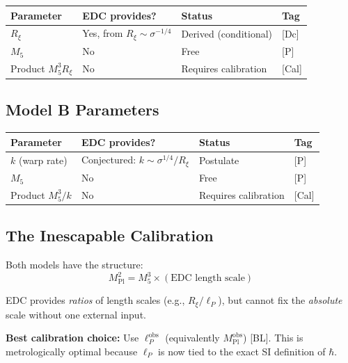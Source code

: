 \documentclass[11pt,a4paper]{article}
\newcommand{\Mpl}{M_{\text{Pl}}}
\newcommand{\Mfive}{M_5}
\newcommand{\Rxi}{R_\xi}
\begin{document}
\begin{center}
\begin{tabular}{@{}llll@{}}
\toprule
\textbf{Parameter} & \textbf{EDC provides?} & \textbf{Status} & \textbf{Tag} \\
\midrule
$\Rxi$ & Yes, from $\Rxi \sim \sigma^{-1/4}$ & Derived (conditional) & [Dc] \\
$\Mfive$ & No & Free & [P] \\
Product $\Mfive^3 \Rxi$ & No & Requires calibration & [Cal] \\
\bottomrule
\end{tabular}
\end{center}

\subsection{Model B Parameters}

\begin{center}
\begin{tabular}{@{}llll@{}}
\toprule
\textbf{Parameter} & \textbf{EDC provides?} & \textbf{Status} & \textbf{Tag} \\
\midrule
$k$ (warp rate) & Conjectured: $k \sim \sigma^{1/4}/\Rxi$ & Postulate & [P] \\
$\Mfive$ & No & Free & [P] \\
Product $\Mfive^3/k$ & No & Requires calibration & [Cal] \\
\bottomrule
\end{tabular}
\end{center}

\subsection{The Inescapable Calibration}

Both models have the structure:
\begin{equation}
\Mpl^2 = \Mfive^3 \times (\text{EDC length scale})
\end{equation}

EDC provides \emph{ratios} of length scales (e.g., $\Rxi/\ell_P$),
but cannot fix the \emph{absolute} scale without one external input.

\textbf{Best calibration choice:} Use $\ell_P^{\text{obs}}$ (equivalently $\Mpl^{\text{obs}}$) [BL].
This is metrologically optimal because $\ell_P$ is now tied to the exact SI definition of $\hbar$.

\end{document}
